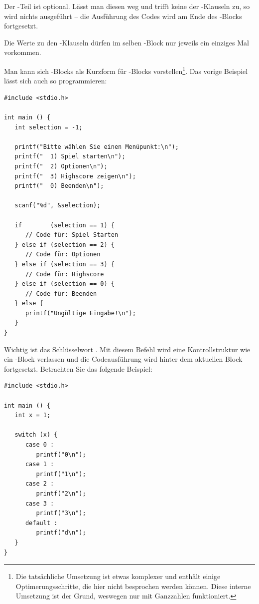 Der -Teil ist optional. Lässt man diesen weg und trifft keine der -Klauseln zu, so wird nichts ausgeführt -- die Ausführung des Codes wird am Ende des -Blocks fortgesetzt.

Die Werte zu den -Klauseln dürfen im selben -Block nur jeweils ein einziges Mal vorkommen.

Man kann sich -Blocks als Kurzform für -Blocks vorstellen\footnote{Die tatsächliche Umsetzung ist etwas komplexer und enthält einige Optimerungsschritte, die hier nicht besprochen werden können. Diese interne Umsetzung ist der Grund, weswegen  nur mit Ganzzahlen funktioniert.}. Das vorige Beispiel lässt sich auch so programmieren:

\begin{codebox}
\begin{verbatim}
#include <stdio.h>

int main () {
   int selection = -1;

   printf("Bitte wählen Sie einen Menüpunkt:\n");
   printf("  1) Spiel starten\n");
   printf("  2) Optionen\n");
   printf("  3) Highscore zeigen\n");
   printf("  0) Beenden\n");

   scanf("%d", &selection);

   if        (selection == 1) {
      // Code für: Spiel Starten
   } else if (selection == 2) {
      // Code für: Optionen
   } else if (selection == 3) {
      // Code für: Highscore
   } else if (selection == 0) {
      // Code für: Beenden
   } else {
      printf("Ungültige Eingabe!\n");
   }
}
\end{verbatim}
\end{codebox}

Wichtig ist das Schlüsselwort . Mit diesem Befehl wird eine Kontrollstruktur wie ein -Block verlassen und die Codeausführung wird hinter dem aktuellen Block fortgesetzt. Betrachten Sie das folgende Beispiel:

\begin{warnbox}[Beispiel: \texttt{switch} ohne \texttt{break}, leftupper=7mm]
\begin{verbatim}
#include <stdio.h>

int main () {
   int x = 1;

   switch (x) {
      case 0 :
         printf("0\n");
      case 1 :
         printf("1\n");
      case 2 :
         printf("2\n");
      case 3 :
         printf("3\n");
      default :
         printf("d\n");
   }
}
\end{verbatim}
\end{warnbox}

